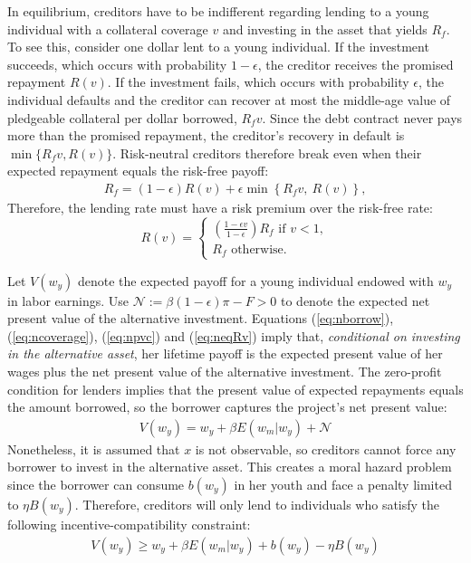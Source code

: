 \documentclass[draft,pdftex,nolinenumbers,noinfoline]{article}
\theoremstyle{plain}
\begin{document}
In equilibrium, creditors have to be indifferent regarding lending to a young individual with a collateral coverage $v$ and investing in the asset that yields $R_f$. To see this, consider one dollar lent to a young individual. If the investment succeeds, which occurs with probability $1-\epsilon$, the creditor receives the promised repayment $R(v)$. If the investment fails, which occurs with probability $\epsilon$, the individual defaults and the creditor can recover at most the middle-age value of pledgeable collateral per dollar borrowed, $R_f v$. Since the debt contract never pays more than the promised repayment, the creditor's recovery in default is $\min\{R_f v,R(v)\}$. Risk-neutral creditors therefore break even when their expected repayment equals the risk-free payoff:
\begin{align}\label{eq:narby}
R_f  = (1-\epsilon)R(v) + \epsilon \min\left\{R_f v, \ R(v)\right\},
\end{align}
Therefore, the lending rate must have a risk premium over the risk-free rate: 
\begin{equation}\label{eq:neqRv}
R(v) = \begin{cases}
\left(\frac{1- \epsilon v}{1-\epsilon}\right)R_f \text{ if } v<1, \\
R_f \text{ otherwise}.
\end{cases}
\end{equation}

Let $V(w_y)$ denote the expected payoff for a young individual endowed with $w_y$ in labor earnings.  Use $\mathcal{N}:=\beta(1-\epsilon)\pi - F>0$ to denote the expected net present value of the alternative investment. 
Equations (\ref{eq:nborrow}), (\ref{eq:ncoverage}), (\ref{eq:npvc}) and (\ref{eq:neqRv}) imply that, \textit{conditional on investing in the alternative asset}, her lifetime payoff  is the expected present value of her wages plus the net present value of the alternative investment. The zero-profit condition for lenders implies that the present value of expected repayments equals the amount borrowed, so the borrower captures the project's net present value:
\begin{align}\label{eq:nVc}
V(w_y) =    w_y  + \beta E(w_m|w_y) +   \mathcal{N}  
\end{align}
Nonetheless, it is assumed that $x$ is not observable, so creditors cannot force any borrower to invest in the alternative asset. This creates a moral hazard problem since the borrower can consume $b(w_y)$ in her youth and face a penalty limited to $\eta B(w_y)$. Therefore, creditors will only lend to individuals who satisfy the following incentive-compatibility constraint:
\begin{align}\label{eq:nicc}
V(w_y) \geq    w_y  + \beta E(w_m|w_y) +   b(w_y) -  \eta B(w_y)  
\end{align}
\end{document}
